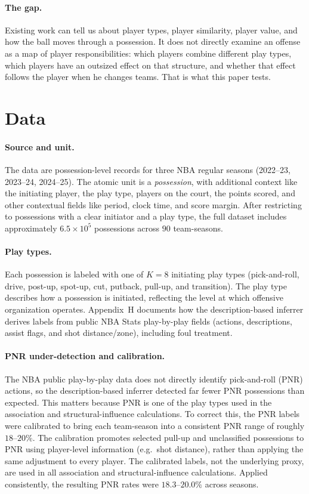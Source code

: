 \documentclass[11pt]{article}
\begin{document}
\paragraph{The gap.}
Existing work can tell us about player types, player similarity, player value, and how the
ball moves through a possession. It does not directly examine an offense as a map of player
responsibilities: which players combine different play types, which players have an outsized
effect on that structure, and whether that effect follows the player when he changes teams.
That is what this paper tests.

\section{Data}
\label{sec:data}

\paragraph{Source and unit.}
The data are possession-level records for three NBA regular seasons
(2022--23, 2023--24, 2024--25). The atomic unit is a \emph{possession}, with additional
context like the initiating player, the play type, players on the court, the points scored,
and other contextual fields like period, clock time, and score margin. After restricting to
possessions with a clear initiator and a play type, the full dataset includes approximately
$6.5\times 10^{5}$ possessions across $90$ team-seasons.

\paragraph{Play types.}
Each possession is labeled with one of $K=8$ initiating play types (pick-and-roll, drive,
post-up, spot-up, cut, putback, pull-up, and transition). The play type describes how a
possession is initiated, reflecting the level at which offensive organization operates.
Appendix~H documents how the description-based inferrer derives labels from public NBA Stats
play-by-play fields (actions, descriptions, assist flags, and shot distance/zone), including
foul treatment.

\paragraph{PNR under-detection and calibration.}
The NBA public play-by-play data does not directly identify pick-and-roll (PNR) actions, so
the description-based inferrer detected far fewer PNR possessions than expected. This matters
because PNR is one of the play types used in the association and structural-influence
calculations.
To correct this, the PNR labels were calibrated to bring each team-season into a consistent
PNR range of roughly $18$--$20\%$. The calibration promotes selected pull-up and unclassified
possessions to PNR using player-level information (e.g.\ shot distance), rather than applying
the same adjustment to every player. The calibrated labels, not the underlying proxy, are
used in all association and structural-influence calculations. Applied consistently, the
resulting PNR rates were $18.3$--$20.0\%$ across seasons.
\end{document}
